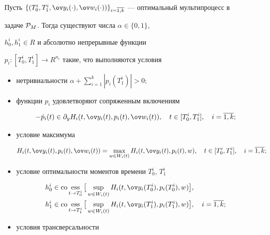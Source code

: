 \begin{thm}


Пусть $\{(T_0^i,T_1^i,\ov y_i(\cdot),\ov


w_i(\cdot))\}_{i=\overline{1,k}}$ --- оптимальный мультипроцесс в


задаче ${\cal P}_M$. Тогда существуют числа $\alpha\in \{0,1\}$,


$h_0^i, h_1^i\in R$ и абсолютно непрерывные функции


$p_i:[T_0^i,T_1^i]\rightarrow R^{n_i}$ такие, что выполняются условия


\begin{itemize}


\item[1)] нетривиальности $\alpha+\sum\limits_{i=1}^k|p_i(T_1^i)|>0;$


\item[2)] функции $p_i$ удовлетворяют сопряженным включениям


$$


-\Dot{p}_i(t)\in\partial_yH_i(t,\ov y_i(t),p_i(t),\ov w_i(t)),


\quad t\in [T_0^i,T_1^i],\quad i=\overline{1,k};


$$


\item[3)] условие максимума


$$


H_i(t,\ov y_i(t),p_i(t),\ov w_i(t))=\max_{w\in


W_i(t)}H_i(t,\ov y_i(t), p_i(t),w),\quad


t\in [T_0^i,T_1^i], \quad i=\overline{1,k};


$$


\item[4)] условие оптимальности моментов времени $T_0^i$, $T_1^i$


\begin{align*}


h_0^i &\in \co \ess_{t\rightarrow T_0^i}\big[\sup_{w\in W_i(t)}H_i(t,\ov


y_i(T_0^i),p_i(T_0^i),w)\big], \\


h_1^i &\in \co\ess_{t\rightarrow T_1^i}\big[\sup_{w\in W_i(t)}H_i(t,\ov


y_i(T_1^i),p_i(T_1^i),w)\big],\quad i=\overline{1,k};


\end{align*}


\item[5)] условия трансверсальности



\end{itemize}
\end{thm}
